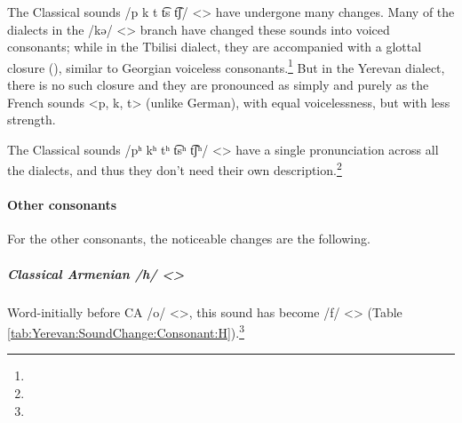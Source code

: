 The Classical sounds /p  k t t͡s t͡ʃ/ <> have undergone many changes. Many of the dialects in the /kə/ <> branch have changed these sounds into voiced consonants; while in the Tbilisi dialect, they are accompanied with a glottal closure (), similar to Georgian voiceless consonants.\footnote{} But in the Yerevan dialect, there is no such closure and they are pronounced as simply and purely as the French sounds <p, k, t> (unlike German), with equal voicelessness, but with less strength. 

The Classical sounds /pʰ kʰ tʰ t͡sʰ t͡ʃʰ/ <> have a single pronunciation across all the dialects, and thus they don't need their own description.\footnote{}

\begin{adjarianpage}\label{page:40}\end{adjarianpage}%

\paragraph{Other consonants}
For the other consonants, the noticeable changes are the following. 

\subparagraph{Classical Armenian /h/ <>}

Word-initially before CA /o/ <>, this sound has become /f/ <> (Table \ref{tab:Yerevan:SoundChange:Consonant:H}).\footnote{}



